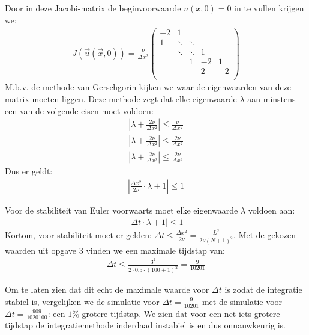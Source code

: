 \documentclass{article}
\newcommand{\Dt}{\Delta t}
\begin{document}
Door in deze Jacobi-matrix de beginvoorwaarde $u(x,0) =0$ in te vullen krijgen we:
\begin{align*}
J(\vec{u}(\vec{x},0)) = \frac{\nu}{\Delta x^2}
\begin{pmatrix}
-2 & 1 & &&\\
1 &\ddots &\ddots&&\\
&\ddots &\ddots&1&\\
& &1&-2&1\\
& &&2&-2\\
\end{pmatrix}
\end{align*}
M.b.v. de methode van Gerschgorin kijken we waar de eigenwaarden van deze matrix moeten liggen.
Deze methode zegt dat elke eigenwaarde $\lambda$ aan minstens een van de volgende eisen moet voldoen:
\begin{align*}
\left|\lambda + \frac{2\nu}{\Delta x^2}\right| \leq \frac{\nu}{\Delta x^2}\\
\left|\lambda + \frac{2\nu}{\Delta x^2}\right| \leq \frac{2\nu}{\Delta x^2}\\
\left|\lambda + \frac{2\nu}{\Delta x^2}\right| \leq \frac{2\nu}{\Delta x^2}
\end{align*}
Dus er geldt:
\begin{align*}
\left|\frac{\Delta x^2}{2\nu} \cdot\lambda +1\right|\leq 1
\end{align*}

Voor de stabiliteit van Euler voorwaarts moet elke eigenwaarde $\lambda$ voldoen aan:
\begin{align*}
\left|\Delta t \cdot\lambda +1\right|\leq 1
\end{align*}
Kortom, voor stabiliteit moet er gelden: $\Delta t \leq \frac{\Delta x^2}{2\nu} =\frac{L^2}{2\nu(N+1)^2}$.
Met de gekozen waarden uit opgave $3$ vinden we een maximale tijdstap van:
\begin{align*}
\Delta t \leq \frac{3^2}{2\cdot 0.5 \cdot(100 +1)^2} = \frac{9}{10201}
\end{align*}

Om te laten zien dat dit echt de maximale waarde voor $\Dt$ is zodat de integratie stabiel is, vergelijken we de simulatie voor $\Dt = \frac{9}{10201}$ met de simulatie voor $\Dt = \frac{909}{1020100}$: een $1\%$ grotere tijdstap.
We zien dat voor een net iets grotere tijdstap de integratiemethode inderdaad instabiel is en dus onnauwkeurig is.
\end{document}

